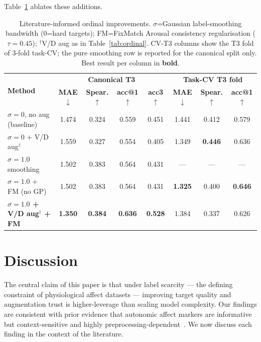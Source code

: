 \documentclass[sigconf,nonacm]{acmart}
\begin{document}
Table~\ref{tab:ordinal_improved} ablates these additions.

\begin{table}[t]
\caption{Literature-informed ordinal improvements.
$\sigma$=Gaussian label-smoothing bandwidth (0=hard targets);
FM=FixMatch Arousal consistency regularisation ($\tau{=}0.45$);
$^\dagger$V/D aug as in Table~\ref{tab:ordinal}.
CV-T3 columns show the T3 fold of 3-fold task-CV; the pure smoothing row is
reported for the canonical split only.
Best result per column in \textbf{bold}.}
\label{tab:ordinal_improved}
\centering
\setlength{\tabcolsep}{6pt}
\small
\begin{tabular}{lcccc|ccc}
\toprule
\multirow{2}{*}{\textbf{Method}} &
\multicolumn{4}{c|}{\textbf{Canonical T3}} &
\multicolumn{3}{c}{\textbf{Task-CV T3 fold}} \\
& \textbf{MAE}$\downarrow$ & \textbf{Spear.}$\uparrow$ &
  \textbf{acc@1}$\uparrow$ & \textbf{acc3}$\uparrow$ &
  \textbf{MAE}$\downarrow$ & \textbf{Spear.}$\uparrow$ &
  \textbf{acc@1}$\uparrow$ \\
\midrule
$\sigma{=}0$, no aug (baseline)          & 1.474 & 0.324 & 0.559 & 0.451 & 1.441 & 0.412 & 0.579 \\
$\sigma{=}0$ + V/D aug$^\dagger$         & 1.559 & 0.327 & 0.554 & 0.405 & 1.349 & \textbf{0.446} & 0.636 \\
$\sigma{=}1.0$ smoothing                 & 1.502 & 0.383 & 0.564 & 0.431 & --- & --- & --- \\
$\sigma{=}1.0$ + FM (no GP)             & 1.502 & 0.383 & 0.564 & 0.431 & \textbf{1.325} & 0.400 & \textbf{0.646} \\
\textbf{$\sigma{=}1.0$ + V/D aug$^\dagger$ + FM} &
  \textbf{1.350} & \textbf{0.384} & \textbf{0.636} & \textbf{0.528} &
  1.384 & 0.337 & 0.626 \\
\bottomrule
\end{tabular}
\end{table}

\section{Discussion}
\label{sec:discussion}

The central claim of this paper is that under label scarcity ---
the defining constraint of physiological affect datasets --- improving
target quality and augmentation trust is higher-leverage than scaling
model complexity.
Our findings are consistent with prior evidence that autonomic affect
markers are informative but context-sensitive and highly
preprocessing-dependent~\cite{kreibig2010autonomic,shu2018review,ahmad2022survey}.
We now discuss each finding in the context of the literature.
\end{document}
